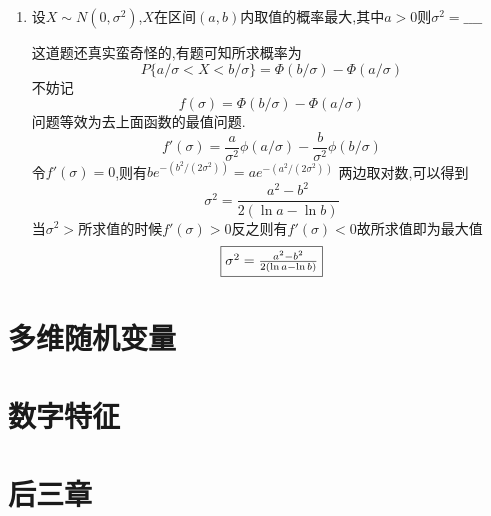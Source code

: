 \documentclass[12pt, a4paper, oneside, UTF8]{ctexbook}
\begin{document}
\begin{enumerate}
    \item 设$X\sim N(0,\sigma^2)$,$X$在区间$(a,b)$内取值的概率最大,其中$a>0$则$\sigma^2=\_\_\_\_$
    
    \begin{solution}
        这道题还真实蛮奇怪的,有题可知所求概率为
        $$P\{a/\sigma < X < b/\sigma\}=\Phi(b/\sigma)-\Phi(a/\sigma)$$
        不妨记
        \[
        f(\sigma)=\Phi(b/\sigma) - \Phi(a/\sigma)
        \]
        问题等效为去上面函数的最值问题. 
        \[
            f'(\sigma) = \frac{a}{\sigma^2}\phi(a/\sigma)-\frac{b}{\sigma^2}\phi(b/\sigma)
        \]
        令$f'(\sigma)=0$,则有$be^{-(b^2/(2\sigma^2))}=ae^{-(a^2/(2\sigma^2))}$
        两边取对数,可以得到 
        \[
        \sigma^2=\frac{a^2-b^2}{2(\ln{a}-\ln{b})}
        \]
        当$\sigma^2>$所求值的时候$f'(\sigma)>0$反之则有$f'(\sigma)<0$故所求值即为最大值 
        \[
        \fbox{$\sigma^2=\frac{a^2-b^2}{2(\ln{a}-\ln{b})}$}
        \]
    \end{solution}
\end{enumerate}


\section{多维随机变量}

\section{数字特征}

\section{后三章}

\ifx\allfiles\undefined
\end{document}
